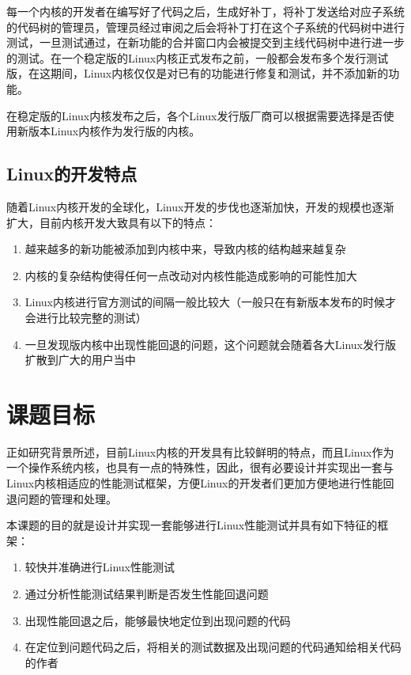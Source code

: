 每一个内核的开发者在编写好了代码之后，生成好补丁，将补丁发送给对应子系统的代码树的管理员，管理员经过审阅之后会将补丁打在这个子系统的代码树中进行测试，一旦测试通过，在新功能的合并窗口内会被提交到主线代码树中进行进一步的测试。在一个稳定版的Linux内核正式发布之前，一般都会发布多个发行测试版，在这期间，Linux内核仅仅是对已有的功能进行修复和测试，并不添加新的功能。

在稳定版的Linux内核发布之后，各个Linux发行版厂商可以根据需要选择是否使用新版本Linux内核作为发行版的内核。

\subsection{Linux的开发特点}

随着Linux内核开发的全球化，Linux开发的步伐也逐渐加快，开发的规模也逐渐扩大，目前内核开发大致具有以下的特点：

\begin{enumerate}
\item 越来越多的新功能被添加到内核中来，导致内核的结构越来越复杂
\item 内核的复杂结构使得任何一点改动对内核性能造成影响的可能性加大
\item Linux内核进行官方测试的间隔一般比较大（一般只在有新版本发布的时候才会进行比较完整的测试）
\item 一旦发现版内核中出现性能回退的问题，这个问题就会随着各大Linux发行版扩散到广大的用户当中
\end{enumerate}

\section{课题目标}

正如研究背景所述，目前Linux内核的开发具有比较鲜明的特点，而且Linux作为一个操作系统内核，也具有一点的特殊性，因此，很有必要设计并实现出一套与Linux内核相适应的性能测试框架，方便Linux的开发者们更加方便地进行性能回退问题的管理和处理。

本课题的目的就是设计并实现一套能够进行Linux性能测试并具有如下特征的框架：

\begin{enumerate}
\item 较快并准确进行Linux性能测试
\item 通过分析性能测试结果判断是否发生性能回退问题
\item 出现性能回退之后，能够最快地定位到出现问题的代码
\item 在定位到问题代码之后，将相关的测试数据及出现问题的代码通知给相关代码的作者
\end{enumerate}